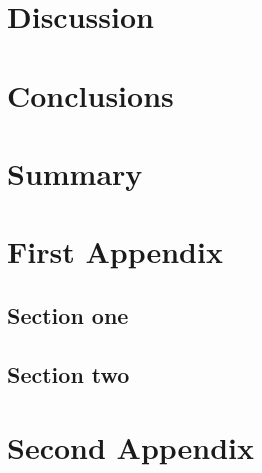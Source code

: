 \documentclass[doublespace,draft,nopageskip]{VTthesis} %
\begin{document}
\chapter{Discussion} \label{ch:discussion}
\chapter{Conclusions} \label{ch:conclusions}
\chapter{Summary} \label{ch:summary}

	
	   

	\appendix

	\begin{appendices}
		\chapter{First Appendix} \label{app:appendix_one}
			\section{Section one} \label{ase:app_one_sect_1}
			\section{Section two} \label{ase:app_one_sect_2}
		\chapter{Second Appendix} \label{app:appendix_two}
	\end{appendices}
\end{document}
